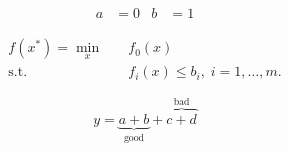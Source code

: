 \documentclass{article}
\begin{document}
\begin{align}
  a &= 0 & b &= 1
\end{align}

\begin{equation}
\begin{aligned}
  f(x^*) = \min_x      & \quad f_0(x) \\
           \text{s.t.} & \quad f_i(x) \leq b_i, \; i = 1, \ldots, m.
\end{aligned}
\end{equation}

\begin{equation}
  y = \underbrace{a + b}_{\text{good}} + \overbrace{c + d}^{\text{bad}}
\end{equation}


% 
% 

% 
\end{document}
